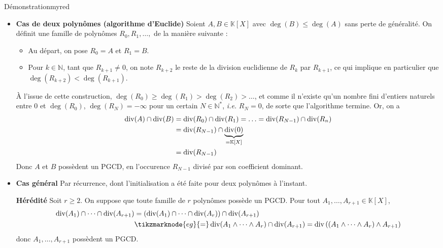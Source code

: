     \begin{demo}{Démonstration}{myred}
        \begin{itemize}
            \item \textbf{Cas de deux polynômes (algorithme d’Euclide)} \quad Soient $A,B \in \mathbb{K}[X]$ avec $\deg(B) \leq \deg(A)$ sans perte de généralité. On définit une famille de polynômes $R_0, R_1,\ldots,$ de la manière suivante :
            \begin{itemize}
                \item Au départ, on pose $R_0 = A$ et $R_1 = B$.
                \item Pour $k \in \mathbb{N}$, tant que $R_{k+1} \neq 0$, on note $R_{k+2}$ le reste de la division euclidienne de $R_k$ par $R_{k+1}$, ce qui implique en particulier que $\deg(R_{k+2}) < \deg(R_{k+1})$.
            \end{itemize}
            À l’issue de cette construction, $\deg(R_0) \geq \deg(R_1) > \deg(R_2) > \ldots$, et comme il n’existe qu’un nombre fini d’entiers naturels entre $0$ et $\deg(R_0)$, $\deg(R_N) = - \infty$ pour un certain $N \in \mathbb{N}^*$, \textit{i.e.} $R_N = 0$, de sorte que l’algorithme termine. Or, on a 
            \begin{align*}
                \operatorname{div}(A) \cap \operatorname{div}(B) 
                &= \operatorname{div}(R_0) \cap \operatorname{div}(R_1) = \ldots = \operatorname{div}(R_{N-1}) \cap \operatorname{div}(R_n) \\
                &= \operatorname{div}(R_{N-1}) \cap \underbrace{\operatorname{div}(0)}_{= \mathbb{K}[X]} \\
                &= \operatorname{div}(R_{N-1})
            \end{align*}
            Donc $A$ et $B$ possèdent un PGCD, en l’occurence $R_{N-1}$ divisé par son coefficient dominant.
            \item \textbf{Cas général} \quad Par récurrence, dont l’initialisation a été faite pour deux polynômes à l’instant.
            
            \textbf{Hérédité} \quad Soit $r \geq 2$. On suppose que toute famille de $r$ polynômes possède un PGCD. Pour tout $A_1,\ldots,A_{r+1} \in \mathbb{K}[X]$, 
            \begin{align*}
                \dive(A_1) \cap \cdots \cap \dive(A_{r+1}) 
                &= \left(\dive(A_1) \cap \cdots \cap \dive(A_r)\right) \cap \dive(A_{r+1}) \\
                &\tikzmarknode{eg}{=} \dive(A_1 \wedge \cdots \wedge A_r) \cap \dive(A_{r+1}) = \dive\left((A_1 \wedge \cdots \wedge A_r) \wedge A_{r+1}\right)
            \end{align*}
             \hfill donc $A_1, \ldots, A_{r+1}$ possèdent un PGCD.
        \end{itemize}
    \end{demo}

